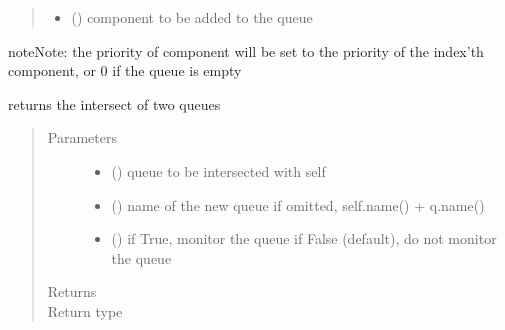 \documentclass[letterpaper,10pt,english]{sphinxmanual}
\begin{document}
\begin{fulllineitems}
\begin{fulllineitems}
\begin{quote}
\begin{description}
\begin{itemize}
\item {} 
 ({\hyperref[\detokenize{Reference:salabim.Component}]{}}) \textendash{} component to be added to the queue

\end{itemize}

\end{description}\end{quote}

\begin{sphinxadmonition}{note}{Note:}
the priority of component will be set to the priority of the index’th component,
or 0 if the queue is empty
\end{sphinxadmonition}

\end{fulllineitems}


\begin{fulllineitems}
\label{\detokenize{Reference:salabim.Queue.intersection}}
returns the intersect of two queues
\begin{quote}\begin{description}
\item[{Parameters}] \leavevmode\begin{itemize}
\item {} 
 ({\hyperref[\detokenize{Reference:salabim.Queue}]{}}) \textendash{} queue to be intersected with self

\item {} 
 () \textendash{} name of the  new queue 
if omitted, self.name() + q.name()

\item {} 
 () \textendash{} if True, monitor the queue 
if False (default), do not monitor the queue

\end{itemize}

\item[{Returns}] \leavevmode
{}

\item[{Return type}] \leavevmode
{\hyperref[\detokenize{Reference:salabim.Queue}]{}}


\end{description}
\end{quote}
\end{fulllineitems}
\end{fulllineitems}
\end{document}
